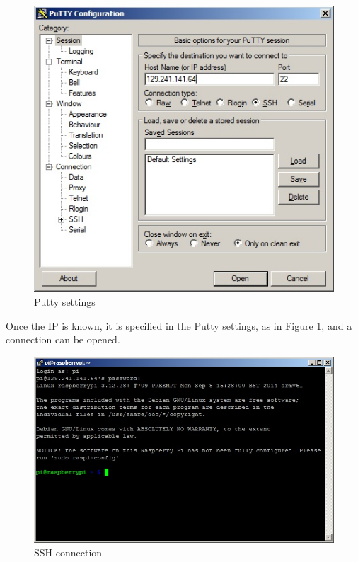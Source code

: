 \documentclass[a4paper,twoside,english]{report}
\begin{document}
\begin{figure}[h!]
\centering \includegraphics[scale=0.45]{fig/Rpi_remote_access1} \caption{Putty settings}

\label{fig: Putty settings} 
\end{figure}

Once the IP is known, it is specified in the Putty settings, as in
Figure \ref{fig: Putty settings}, and a connection can be opened.

\begin{figure}[h!]
\centering \includegraphics[scale=0.45]{fig/Rpi_remote_access2} \caption{SSH connection}

\label{fig: SSH connection} 
\end{figure}
\end{document}
